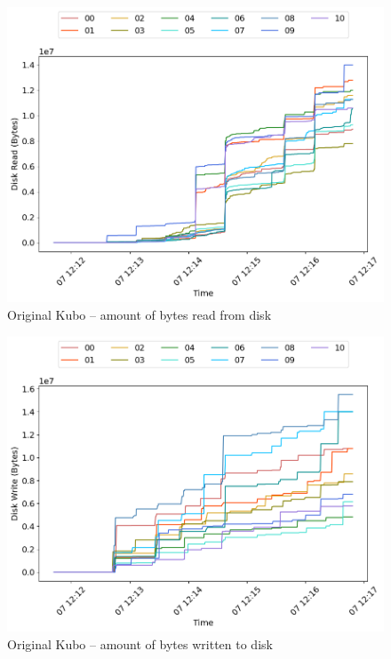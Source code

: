 \begin{minipage}{0.5\linewidth}
\begin{figure}[H]
\captionsetup{justification=centering,width=0.8\linewidth}
\includegraphics[width=\linewidth]{figures/original/blk_read.png}
\caption{Original Kubo -- amount of bytes read from disk}
\label{fig:original-blk_read}
\end{figure}
\end{minipage}
\begin{minipage}{0.5\linewidth}
\begin{figure}[H]
\captionsetup{justification=centering,width=0.8\linewidth}
\includegraphics[width=\linewidth]{figures/original/blk_write.png}
\caption{Original Kubo -- amount of bytes written to disk}
\label{fig:original-blk_write}
\end{figure}
\end{minipage}

